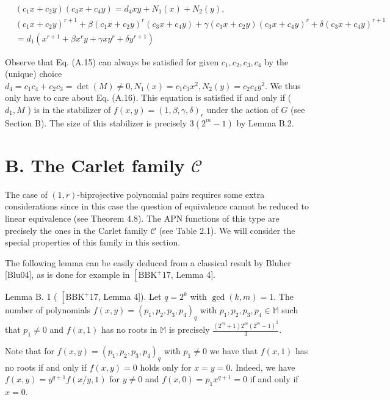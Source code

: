 \documentclass[10pt]{article}
\begin{document}
\begin{align*}
& \left(c_{1} x+c_{2} y\right)\left(c_{3} x+c_{4} y\right)=d_{4} x y+N_{1}(x)+N_{2}(y),  \tag{A.15}\\
& \left(c_{1} x+c_{2} y\right)^{r+1}+\beta\left(c_{1} x+c_{2} y\right)^{r}\left(c_{3} x+c_{4} y\right)+\gamma\left(c_{1} x+c_{2} y\right)\left(c_{3} x+c_{4} y\right)^{r}+\delta\left(c_{3} x+c_{4} y\right)^{r+1} \\
& =d_{1}\left(x^{r+1}+\beta x^{r} y+\gamma x y^{r}+\delta y^{r+1}\right) \tag{A.16}
\end{align*}


Observe that Eq. (A.15) can always be satisfied for given $c_{1}, c_{2}, c_{3}, c_{4}$ by the (unique) choice $d_{4}=c_{1} c_{4}+c_{2} c_{3}=\operatorname{det}(M) \neq 0, N_{1}(x)=c_{1} c_{3} x^{2}, N_{2}(y)=c_{2} c_{4} y^{2}$. We thus only have to care about Eq. (A.16). This equation is satisfied if and only if ( $d_{1}, M$ ) is in the stabilizer of $f(x, y)=(1, \beta, \gamma, \delta)_{r}$ under the action of $G$ (see Section B). The size of this stabilizer is precisely $3\left(2^{m}-1\right)$ by Lemma B.2.

\section*{B. The Carlet family $\mathcal{C}$}
The case of $(1, r)$-biprojective polynomial pairs requires some extra considerations since in this case the question of equivalence cannot be reduced to linear equivalence (see Theorem 4.8). The APN functions of this type are precisely the ones in the Carlet family $\mathcal{C}$ (see Table 2.1). We will consider the special properties of this family in this section.

The following lemma can be easily deduced from a classical result by Bluher [Blu04], as is done for example in $\left[\mathrm{BBK}^{+} 17\right.$, Lemma 4].

Lemma B. 1 ( $\left[\mathrm{BBK}^{+} 17\right.$, Lemma 4]). Let $q=2^{k}$ with $\operatorname{gcd}(k, m)=1$. The number of polynomials $f(x, y)=\left(p_{1}, p_{2}, p_{3}, p_{4}\right)_{q}$ with $p_{1}, p_{2}, p_{3}, p_{4} \in \mathbb{M}$ such that $p_{1} \neq 0$ and $f(x, 1)$ has no roots in $\mathbb{M}$ is precisely $\frac{\left(2^{m}+1\right) 2^{m}\left(2^{m}-1\right)^{2}}{3}$.

Note that for $f(x, y)=\left(p_{1}, p_{2}, p_{3}, p_{4}\right)_{q}$ with $p_{1} \neq 0$ we have that $f(x, 1)$ has no roots if and only if $f(x, y)=0$ holds only for $x=y=0$. Indeed, we have $f(x, y)=y^{q+1} f(x / y, 1)$ for $y \neq 0$ and $f(x, 0)=p_{1} x^{q+1}=0$ if and only if $x=0$.
\end{document}
